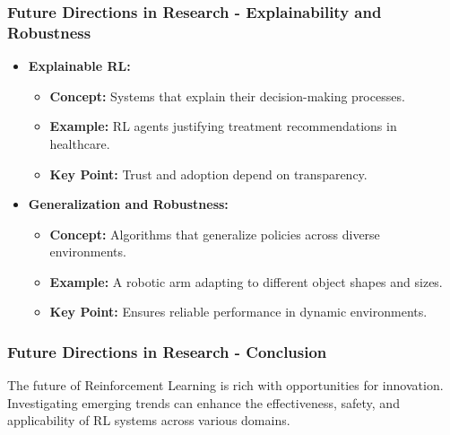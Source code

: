 \documentclass{beamer}
\begin{document}
\begin{frame}[fragile]
    \frametitle{Future Directions in Research - Explainability and Robustness}
    \begin{itemize}
        \item \textbf{Explainable RL:}
            \begin{itemize}
                \item \textbf{Concept:} Systems that explain their decision-making processes.
                \item \textbf{Example:} RL agents justifying treatment recommendations in healthcare.
                \item \textbf{Key Point:} Trust and adoption depend on transparency.
            \end{itemize}
        \item \textbf{Generalization and Robustness:}
            \begin{itemize}
                \item \textbf{Concept:} Algorithms that generalize policies across diverse environments.
                \item \textbf{Example:} A robotic arm adapting to different object shapes and sizes.
                \item \textbf{Key Point:} Ensures reliable performance in dynamic environments.
            \end{itemize}
    \end{itemize}
\end{frame}

\begin{frame}[fragile]
    \frametitle{Future Directions in Research - Conclusion}
    The future of Reinforcement Learning is rich with opportunities for innovation. Investigating emerging trends can enhance the effectiveness, safety, and applicability of RL systems across various domains.
\end{frame}
\end{document}
